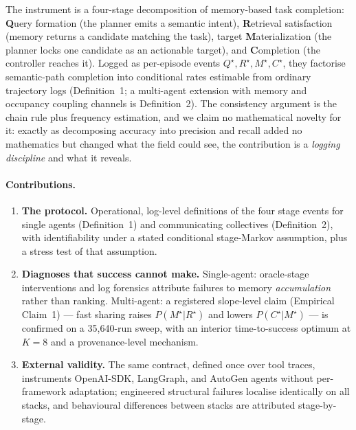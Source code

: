 \documentclass[letterpaper]{article} %
\begin{document}
The instrument is a four-stage decomposition of memory-based task
completion: \textbf{Q}uery formation (the planner emits a semantic
intent), \textbf{R}etrieval satisfaction (memory returns a candidate
matching the task), target \textbf{M}aterialization (the planner locks
one candidate as an actionable target), and \textbf{C}ompletion (the
controller reaches it). Logged as per-episode events
$Q^\star,R^\star,M^\star,C^\star$, they factorise semantic-path
completion into conditional rates estimable from ordinary trajectory
logs (Definition~1; a multi-agent extension with memory and occupancy
coupling channels is Definition~2). The consistency argument is the
chain rule plus frequency estimation, and we claim no mathematical
novelty for it: exactly as decomposing accuracy into precision and
recall added no mathematics but changed what the field could see, the
contribution is a \emph{logging discipline} and what it reveals.

\paragraph{Contributions.}
\begin{enumerate}
\item \textbf{The protocol.} Operational, log-level definitions of the
  four stage events for single agents (Definition~1) and communicating
  collectives (Definition~2), with identifiability under a stated
  conditional stage-Markov assumption, plus a stress test of that
  assumption.
\item \textbf{Diagnoses that success cannot make.} Single-agent:
  oracle-stage interventions and log forensics attribute failures to
  memory \emph{accumulation} rather than ranking. Multi-agent: a
  registered slope-level claim (Empirical Claim~1) --- fast sharing
  raises $P(M^\star|R^\star)$ and lowers $P(C^\star|M^\star)$ --- is
  confirmed on a 35{,}640-run sweep, with an interior time-to-success
  optimum at $K{=}8$ and a provenance-level mechanism.
\item \textbf{External validity.} The same contract, defined once over
  tool traces, instruments OpenAI-SDK, LangGraph, and AutoGen agents
  without per-framework adaptation; engineered structural failures
  localise identically on all stacks, and behavioural differences
  between stacks are attributed stage-by-stage.
\end{enumerate}
\end{document}
